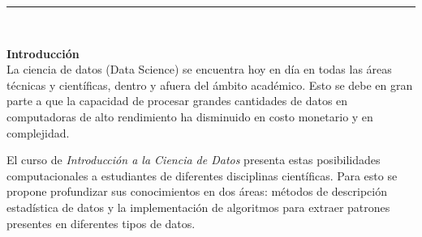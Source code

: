 \documentclass[letterpaper,10pt,onecolumn]{article}
\begin{document}







\noindent\rule{\textwidth}{1pt}\\[-0.1cm]

\addtocounter{mysection}{1}

\noindent\textbf{\large {} \quad Introducci\'on}\\[-0.2cm]


\noindent\normalsize 
La ciencia de datos (Data Science) se encuentra hoy en d\'ia en
todas las \'areas t\'ecnicas y cient\'ificas, dentro y afuera del
\'ambito acad\'emico.
Esto se debe en gran parte a que la capacidad de procesar grandes
cantidades de datos en computadoras de alto  rendimiento ha disminuido
en costo monetario y en complejidad. 

El curso de \textit{Introducci\'on a la Ciencia de Datos}
presenta estas posibilidades computacionales a estudiantes de diferentes disciplinas
cient\'ificas. Para esto se propone profundizar sus conocimientos
en dos \'areas: m\'etodos de descripci\'on estad\'istica de datos y la
implementaci\'on de algoritmos para extraer patrones presentes en
diferentes tipos de datos.
\end{document}
